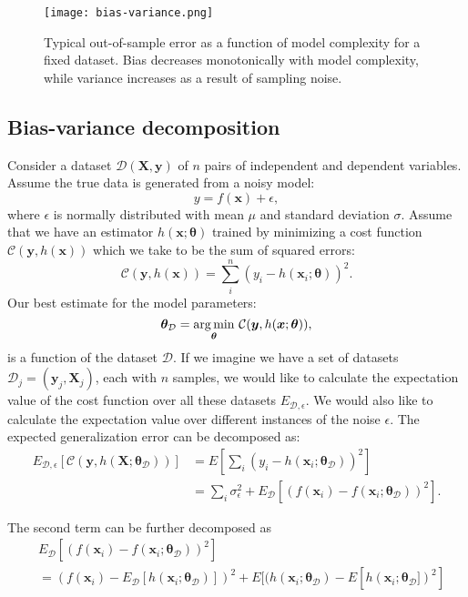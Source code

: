 \begin{figure}
    \texttt{[image: bias-variance.png]}
    \caption{Typical out-of-sample error as a function
    of model complexity for a fixed dataset. Bias decreases monotonically with
    model complexity, while variance increases as a result of
    sampling noise.}
\end{figure}

\subsection{Bias-variance decomposition}
Consider a dataset $\mathcal{D}(\bm{X}, \bm{y})$ of $n$ pairs
of independent and dependent variables. Assume the true data
is generated from a noisy model:
$$ y = f(\bm{x}) + \epsilon ,$$
where $\epsilon$ is normally distributed with mean $\mu$ and
standard deviation $\sigma$. Assume that we have an estimator $h(\bm{x}; \bm{\theta})$
trained by minimizing a cost function $\mathcal{C}(\bm{y}, h(\bm{x}))$
which we take to be the sum of squared errors:
$$ \mathcal{C}(\bm{y}, h(\bm{x})) = \sum_i^n (y_i - h(\bm{x}_i; \bm{\theta}))^2 .$$
Our best estimate for the model parameters:
$$ \bm{\theta}_{\mathcal{D}} = \underset{\bm{\theta}}{\operatorname*{arg\,min}} \
\mathcal{C}(\bm{y}, h(\bm{x}; \bm{\theta})) ,$$
is a function of the dataset $\mathcal{D}$. If we imagine we have a set of
datasets $\mathcal{D}_j = (\bm{y}_j, \bm{X}_j)$, each with $n$ samples, we would like to calculate
the expectation value of the cost function over all these datasets $E_{\mathcal{D}, \epsilon}$.
We would also like to calculate the expectation value over different instances of the noise $\epsilon$.
The expected generalization error can be decomposed as:
\begin{equation}
\begin{split}
    E_{\mathcal{D}, \epsilon} [\mathcal{C}(\bm{y}, h(\bm{X} ; \bm{\theta}_{\mathcal{D}}))]
    &= E \left[ \sum_i (y_i - h(\bm{x}_i ; \bm{\theta}_{\mathcal{D}}))^2 \right] \\
    &= \sum_i \sigma_{\epsilon}^2 + E_{\mathcal{D}}[(f(\bm{x}_i) - f(\bm{x}_i ; \bm{\theta}_{\mathcal{D}}))^2] .
\end{split}
\end{equation}

The second term can be further decomposed as
\begin{equation}
\begin{split}
    &E_{\mathcal{D}}[(f(\bm{x}_i) - f(\bm{x}_i ; \bm{\theta}_{\mathcal{D}}))^2] \\
    &= (f(\bm{x}_i) - E_{\mathcal{D}}[h(\bm{x}_i ; \bm{\theta}_{\mathcal{D}})])^2
    + E[(h(\bm{x}_i ; \bm{\theta}_{\mathcal{D}}) - E[h(\bm{x}_i ; \bm{\theta}_{\mathcal{D}}])^2]
\end{split}
\end{equation}

